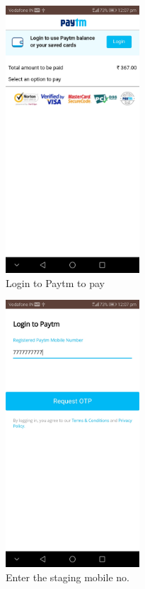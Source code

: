 \documentclass{report}
\begin{document}
\begin{figure}[h!]
\begin{subfigure}[h!]{.3\textwidth}
\centering
\includegraphics[width=5cm]{paytm_start.jpg}
\caption{\centering Login to Paytm to pay}
\end{subfigure}
\begin{subfigure}[h!]{.3\textwidth}
\centering
\includegraphics[width=5cm]{mobile_number.jpg}
\caption{\centering Enter the staging mobile no.}
\end{subfigure}
\begin{subfigure}[h!]{.3\textwidth}
\centering

\end{subfigure}
\end{figure}
\end{document}
